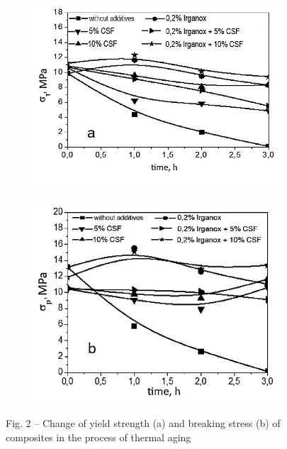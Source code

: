 \begin{figure}[H]
    \centering
    \begin{subfigure}[t]{0.4\textwidth} %
        \centering
        \includegraphics[width=\textwidth]{media/chem/image20}
    \end{subfigure}
    \hspace{0.05\textwidth} %
    \begin{subfigure}[t]{0.4\textwidth} %
        \centering
        \includegraphics[width=\textwidth]{media/chem/image21}
    \end{subfigure}
    \caption*{Fig. 2 -- Change of yield strength (a) and breaking stress (b)
of composites in the process of thermal aging}
\end{figure}

